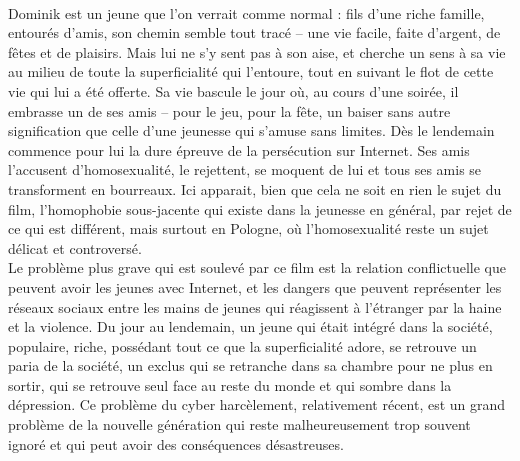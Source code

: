 \documentclass[12pt]{amsart}
\begin{document}
\paragraph{}
Dominik est un jeune que l’on verrait comme normal : fils d’une riche famille, entourés d’amis, son chemin semble tout tracé – une vie facile, faite d’argent, de fêtes et de plaisirs. Mais lui ne s’y sent pas à son aise, et cherche un sens à sa vie au milieu de toute la superficialité qui l’entoure, tout en suivant le flot de cette vie qui lui a été offerte. Sa vie bascule le jour où, au cours d’une soirée, il embrasse un de ses amis – pour le jeu, pour la fête, un baiser sans autre signification que celle d’une jeunesse qui s’amuse sans limites. Dès le lendemain commence pour lui la dure épreuve de la persécution sur Internet. Ses amis l’accusent d’homosexualité, le rejettent, se moquent de lui et tous ses amis se transforment en bourreaux. Ici apparait, bien que cela ne soit en rien le sujet du film, l’homophobie sous-jacente qui existe dans la jeunesse en général, par rejet de ce qui est différent, mais surtout en Pologne, où l’homosexualité reste un sujet délicat et controversé.\\
Le problème plus grave qui est soulevé par ce film est la relation conflictuelle que peuvent avoir les jeunes avec Internet, et les dangers que peuvent représenter les réseaux sociaux entre les mains de jeunes qui réagissent à l’étranger par la haine et la violence. Du jour au lendemain, un jeune qui était intégré dans la société, populaire, riche, possédant tout ce que la superficialité adore, se retrouve un paria de la société, un exclus qui se retranche dans sa chambre pour ne plus en sortir, qui se retrouve seul face au reste du monde et qui sombre dans la dépression. Ce problème du cyber harcèlement, relativement récent, est un grand problème de la nouvelle génération qui reste malheureusement trop souvent ignoré et qui peut avoir des conséquences désastreuses. 
\end{document}
